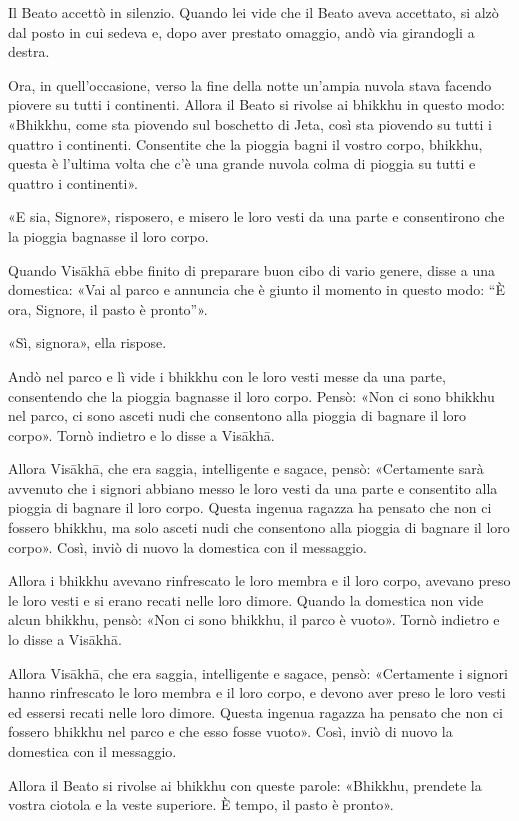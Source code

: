 Il Beato accettò in silenzio. Quando lei vide che il Beato aveva
accettato, si alzò dal posto in cui sedeva e, dopo aver prestato
omaggio, andò via girandogli a destra.


Ora, in quell’occasione, verso la fine della notte un’ampia nuvola stava
facendo piovere su tutti i continenti. Allora il Beato si rivolse ai
bhikkhu in questo modo: «Bhikkhu, come sta piovendo sul boschetto di
Jeta, così sta piovendo su tutti i quattro i continenti. Consentite che
la pioggia bagni il vostro corpo, bhikkhu, questa è l’ultima volta che
c’è una grande nuvola colma di pioggia su tutti e quattro i continenti».


«E sia, Signore», risposero, e misero le loro vesti da una parte e
consentirono che la pioggia bagnasse il loro corpo.


Quando Visākhā ebbe finito di preparare buon cibo di vario genere, disse
a una domestica: «Vai al parco e annuncia che è giunto il momento in
questo modo: “È ora, Signore, il pasto è pronto”».


«Sì, signora», ella rispose.


Andò nel parco e lì vide i bhikkhu con le loro vesti messe da una parte,
consentendo che la pioggia bagnasse il loro corpo. Pensò: «Non ci sono
bhikkhu nel parco, ci sono asceti nudi che consentono alla pioggia di
bagnare il loro corpo». Tornò indietro e lo disse a Visākhā.


Allora Visākhā, che era saggia, intelligente e sagace, pensò:
«Certamente sarà avvenuto che i signori abbiano messo le loro vesti da
una parte e consentito alla pioggia di bagnare il loro corpo. Questa
ingenua ragazza ha pensato che non ci fossero bhikkhu, ma solo asceti
nudi che consentono alla pioggia di bagnare il loro corpo». Così, inviò
di nuovo la domestica con il messaggio.


Allora i bhikkhu avevano rinfrescato le loro membra e il loro corpo,
avevano preso le loro vesti e si erano recati nelle loro dimore. Quando
la domestica non vide alcun bhikkhu, pensò: «Non ci sono bhikkhu, il
parco è vuoto». Tornò indietro e lo disse a Visākhā.


Allora Visākhā, che era saggia, intelligente e sagace, pensò:
«Certamente i signori hanno rinfrescato le loro membra e il loro corpo,
e devono aver preso le loro vesti ed essersi recati nelle loro dimore.
Questa ingenua ragazza ha pensato che non ci fossero bhikkhu nel parco e
che esso fosse vuoto». Così, inviò di nuovo la domestica con il
messaggio.


Allora il Beato si rivolse ai bhikkhu con queste parole: «Bhikkhu,
prendete la vostra ciotola e la veste superiore. È tempo, il pasto è
pronto».


